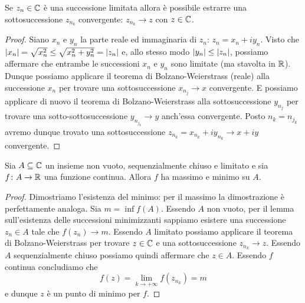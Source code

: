 \begin{theorem}
Se $z_n\in {\mathbb C}$ è una successione limitata allora
è possibile estrarre una sottosuccessione $z_{n_k}$ convergente:
$z_{n_k} \to z$ con $z\in {\mathbb C}$.
\end{theorem}
%
\begin{proof}
Siano $x_n$ e $y_n$ la parte reale ed immaginaria di $z_n$: $z_n = x_n + i y_n$. Visto che ${\left|x_n\right|} =\sqrt{x_n^2}\le \sqrt{x_n^2+y_n^2} = {\left|z_n\right|}$ e, allo stesso modo ${\left|y_n\right|} \le {\left|z_n\right|}$,
possiamo affermare che entrambe le successioni $x_n$ e $y_n$ sono limitate (ma stavolta in ${\mathbb R}$).
Dunque possiamo applicare il teorema di Bolzano-Weierstrass (reale) alla successione $x_n$ per trovare una sottosuccessione $x_{n_j}\to x$ convergente. E possiamo applicare di nuovo il teorema di Bolzano-Weierstrass alla sottosuccessione $y_{n_j}$ per trovare una sotto-sottosuccessione $y_{n_{j_k}}\to y$ anch'essa convergente.
Posto $n_k = n_{j_k}$ avremo dunque trovato una sottosuccessione $z_{n_k} = x_{n_k} + i y_{n_k} \to x+iy$ convergente.
\end{proof}

\begin{theorem}
Sia $A\subseteq {\mathbb C}$ un insieme non vuoto, sequenzialmente chiuso e limitato e sia $f\colon A \to {\mathbb R}$ una funzione continua.
Allora $f$ ha massimo e minimo su $A$.
\end{theorem}
%
\begin{proof}
Dimostriamo l'esistenza del minimo: per il massimo la dimostrazione è perfettamente analoga.
Sia $m=\inf f(A)$.
Essendo $A$ non vuoto, per il lemma sull'esistenza delle successioni minimizzanti sappiamo esistere una successione $z_n \in A$ tale che $f(z_n) \to m$.
Essendo $A$ limitato possiamo applicare il teorema di Bolzano-Weierstrass per trovare $z\in {\mathbb C}$ e una sottosuccessione $z_{n_k} \to z$. Essendo $A$ sequenzialmente chiuso possiamo quindi affermare che $z\in A$. Essendo $f$ continua concludiamo che
\[
f(z) = \lim_{k\to+\infty} f(z_{n_k}) = m
\]
e dunque $z$ è un punto di minimo per $f$.
\end{proof}


